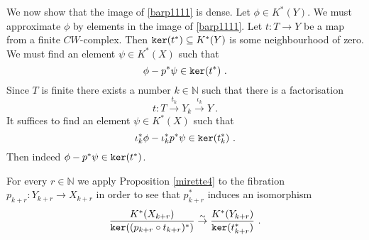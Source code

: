 \documentclass[12pt]{article}
\renewcommand{\ker}{{\tt ker}}
\newcommand{\nat}{{\mathbb{N}}}
\begin{document}
\bigskip

We now show that the image of \eqref{barp1111} is dense.
Let $\phi\in K^{*}(Y)$. We must approximate $\phi$ by elements in the image of \eqref{barp1111}.
 Let $t:T\to Y$ be a map from a finite $CW$-complex. Then $\ker(t^{*})\subseteq K^{*}(Y)$ is some neighbourhood of zero. We must   find an element
 $\psi\in K^{*}(X)$ such that 
 \begin{equation}\label{thegoal1111}\phi-p^{*}\psi\in \ker(t^{*})\ .\end{equation}
  Since $T$ is finite there exists a number  $k \in \nat $ such that there is a factorisation $$t:T\stackrel{  t_{k}}{\to} Y_{k }\stackrel{\iota_{k}}{\to} Y\ .$$ 
 It suffices to find  an element $\psi\in K^{*}(X)$ such that
  \begin{equation}\label{thegoal111}\iota_{k}^{*}\phi-\iota_{k}^{*}p^{*}\psi\in \ker(   t_{k}^{*})\ .\end{equation}
  Then indeed $\phi-p^{*}\psi\in \ker(t^{*})$.
  
  
  For every $r\in \nat$  we apply  Proposition \ref{mirette4} to the fibration $p_{k+r }:Y_{k+r }\to X_{k+r }$
  in order to see that $p_{k+r}^{*}$ induces an isomorphism
$$\frac{K^{*}(X_{k+r})}{\ker((p_{k+r}\circ t_{k+r})^{*})}\stackrel{\sim}{\to}  \frac{K^{*}(Y_{k+r})}{\ker(t^{*}_{k+r})}\ .$$
\end{document}
